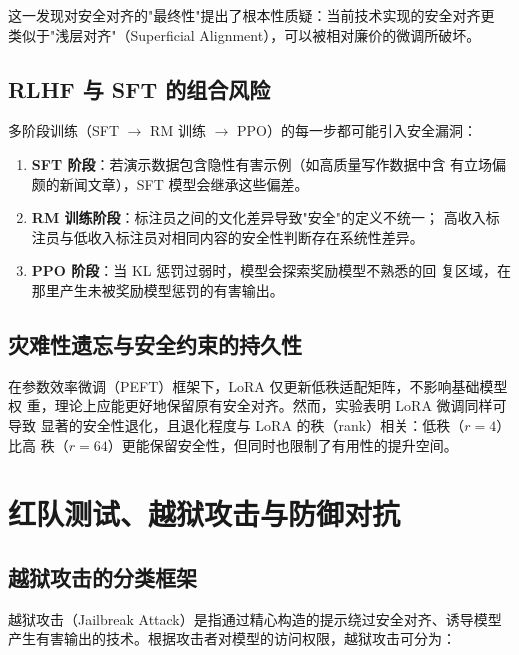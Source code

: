 \documentclass[12pt,a4paper,UTF8]{ctexart}
\begin{document}
这一发现对安全对齐的"最终性"提出了根本性质疑：当前技术实现的安全对齐更
类似于"浅层对齐"（Superficial Alignment），可以被相对廉价的微调所破坏。

\subsection{RLHF 与 SFT 的组合风险}

多阶段训练（SFT $\to$ RM 训练 $\to$ PPO）的每一步都可能引入安全漏洞：

\begin{enumerate}[leftmargin=2em]
  \item \textbf{SFT 阶段}：若演示数据包含隐性有害示例（如高质量写作数据中含
    有立场偏颇的新闻文章），SFT 模型会继承这些偏差。
  \item \textbf{RM 训练阶段}：标注员之间的文化差异导致"安全"的定义不统一；
    高收入标注员与低收入标注员对相同内容的安全性判断存在系统性差异。
  \item \textbf{PPO 阶段}：当 KL 惩罚过弱时，模型会探索奖励模型不熟悉的回
    复区域，在那里产生未被奖励模型惩罚的有害输出。
\end{enumerate}

\subsection{灾难性遗忘与安全约束的持久性}

在参数效率微调（PEFT）框架下，LoRA 仅更新低秩适配矩阵，不影响基础模型权
重，理论上应能更好地保留原有安全对齐。然而，实验表明 LoRA 微调同样可导致
显著的安全性退化，且退化程度与 LoRA 的秩（rank）相关：低秩（$r=4$）比高
秩（$r=64$）更能保留安全性，但同时也限制了有用性的提升空间。

\section{红队测试、越狱攻击与防御对抗}
\label{sec:redteam}

\subsection{越狱攻击的分类框架}

越狱攻击（Jailbreak Attack）是指通过精心构造的提示绕过安全对齐、诱导模型
产生有害输出的技术。根据攻击者对模型的访问权限，越狱攻击可分为：
\end{document}
